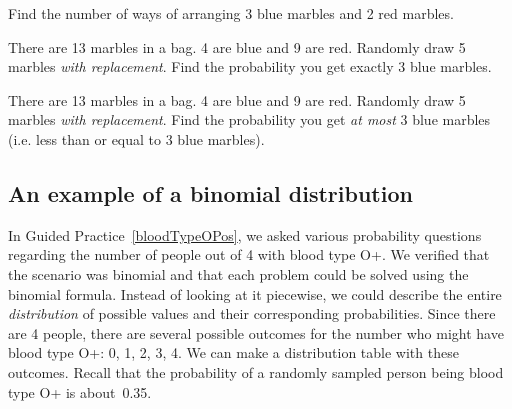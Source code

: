 \begin{exercisewrap}
\begin{nexercise}
Find the number of ways of arranging 3 blue marbles and 2 red marbles.\footnotemark
\end{nexercise}
\end{exercisewrap}
\vspace{-2mm}


\begin{exercisewrap}
\begin{nexercise}There are 13 marbles in a bag. 4 are blue and 9 are red. Randomly draw 5 marbles \emph{with replacement}. Find the probability you get exactly 3 blue marbles.\footnotemark
\end{nexercise}
\end{exercisewrap}
\vspace{-2mm}

\begin{exercisewrap}
\begin{nexercise}There are 13 marbles in a bag. 4 are blue and 9 are red. Randomly draw 5 marbles \emph{with replacement}. Find the probability you get \emph{at most} 3 blue marbles (i.e. less than or equal to 3 blue marbles).\footnotemark
\end{nexercise}
\end{exercisewrap}



\subsection{An example of a binomial distribution}

\newcommand{\oposprob}[0]{0.35}
\newcommand{\oposprobcomp}[0]{0.65}

In Guided Practice~\ref{bloodTypeOPos}, we asked various probability questions regarding the number of people out of 4 with blood type O+.  We verified that the scenario was binomial and that each problem could be solved using the binomial formula. Instead of looking at it piecewise, we could describe the entire \emph{distribution} of possible values and their corresponding probabilities. Since there are 4 people, there are several possible outcomes for the number who might have blood type O+: 0, 1, 2, 3, 4.
We can make a distribution table with these outcomes.
Recall that the probability of a randomly sampled person being blood type O+ is about~\oposprob{}.

